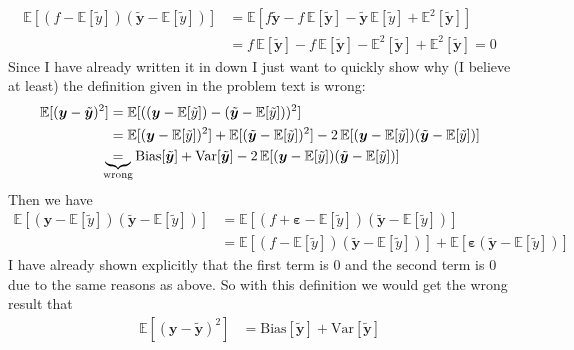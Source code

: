 \documentclass{article}
\begin{document}
	\begin{align*}
		\mathbb{E}[(f-\mathbb{E}[\tilde y])(\tilde{\bm y}-\mathbb{E}[\tilde y])]&=\mathbb{E}[f\tilde{\bm y}-f\,\mathbb{E}[\tilde{\bm y}]-\tilde{\bm y}\,\mathbb{E}[\tilde y]+\mathbb{E}^2[\tilde{\bm y}]]\\
		&=f\,\mathbb{E}[\tilde{\bm y}]-f\,\mathbb{E}[\tilde{\bm y}]-\mathbb{E}^2[\tilde{\bm y}]+\mathbb{E}^2[\tilde{\bm y}]=0
	\end{align*}
	Since I have already written it in down I just want to quickly show why (I believe at least) the definition given in the problem text is wrong:
	\begin{align*}
		\mathbb{E}[(\bm y-\tilde{\bm y})^2]&=\mathbb{E}[((\bm y-\mathbb{E}[\tilde y])-(\tilde{\bm y}-\mathbb{E}[\tilde y]))^2]\\
		&=\mathbb{E}[(\bm y-\mathbb{E}[\tilde y])^2]+\mathbb{E}[(\tilde{\bm y}-\mathbb{E}[\tilde y])^2]-2\,\mathbb{E}[(\bm y-\mathbb{E}[\tilde y])(\tilde{\bm y}-\mathbb{E}[\tilde y])]\\
		&\hspace{-2mm}\underbrace{=}_{\text{wrong}}\text{Bias}[\tilde{\bm y}]+\text{Var}[\tilde{\bm y}]-2\,\mathbb{E}[(\bm y-\mathbb{E}[\tilde y])(\tilde{\bm y}-\mathbb{E}[\tilde y])]
	\end{align*}
	Then we have
	\begin{align*}
		\mathbb{E}[(\bm y-\mathbb{E}[\tilde y])(\tilde{\bm y}-\mathbb{E}[\tilde y])]&=\mathbb{E}[(f+\bm\varepsilon-\mathbb{E}[\tilde y])(\tilde{\bm y}-\mathbb{E}[\tilde y])]\\
		&=\mathbb{E}[(f-\mathbb{E}[\tilde y])(\tilde{\bm y}-\mathbb{E}[\tilde y])]+\mathbb{E}[\bm\varepsilon(\tilde{\bm y}-\mathbb{E}[\tilde y])]
	\end{align*}
	I have already shown explicitly that the first term is $0$ and the second term is 0 due to the same reasons as above. So with this definition we would get the wrong result that
	\begin{align*}
		\mathbb{E}[(\bm y-\tilde{\bm y})^2]&=\text{Bias}[\tilde{\bm y}]+\text{Var}[\tilde{\bm y}]
	\end{align*}
	
		
\end{document}

